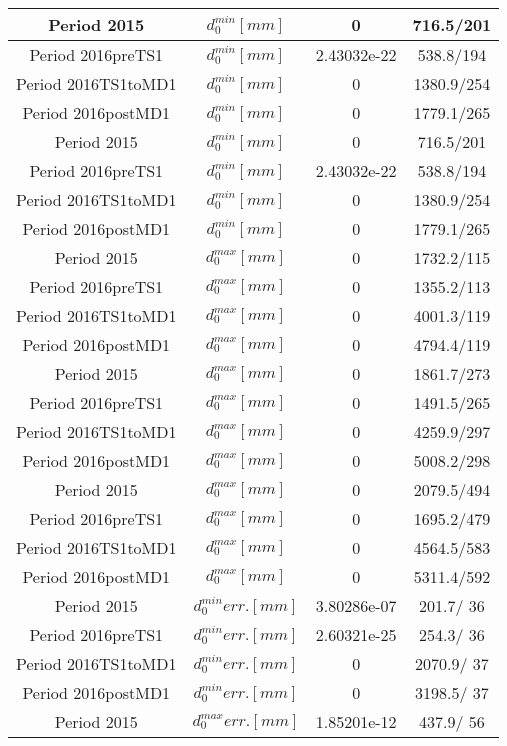 \documentclass{article}
\begin{document}
\begin{longtable}{c|c|c|c}
\hline
 Period 2015 & $d_{0}^{min} [mm]$ & 0 & 716.5/201\\
\hline
 Period 2016preTS1 & $d_{0}^{min} [mm]$ & 2.43032e-22 & 538.8/194\\
\hline
 Period 2016TS1toMD1 & $d_{0}^{min} [mm]$ & 0 & 1380.9/254\\
\hline
 Period 2016postMD1 & $d_{0}^{min} [mm]$ & 0 & 1779.1/265\\
\hline
 Period 2015 & $d_{0}^{min} [mm]$ & 0 & 716.5/201\\
\hline
 Period 2016preTS1 & $d_{0}^{min} [mm]$ & 2.43032e-22 & 538.8/194\\
\hline
 Period 2016TS1toMD1 & $d_{0}^{min} [mm]$ & 0 & 1380.9/254\\
\hline
 Period 2016postMD1 & $d_{0}^{min} [mm]$ & 0 & 1779.1/265\\
\hline
 Period 2015 & $d_{0}^{max} [mm]$ & 0 & 1732.2/115\\
\hline
 Period 2016preTS1 & $d_{0}^{max} [mm]$ & 0 & 1355.2/113\\
\hline
 Period 2016TS1toMD1 & $d_{0}^{max} [mm]$ & 0 & 4001.3/119\\
\hline
 Period 2016postMD1 & $d_{0}^{max} [mm]$ & 0 & 4794.4/119\\
\hline
 Period 2015 & $d_{0}^{max} [mm]$ & 0 & 1861.7/273\\
\hline
 Period 2016preTS1 & $d_{0}^{max} [mm]$ & 0 & 1491.5/265\\
\hline
 Period 2016TS1toMD1 & $d_{0}^{max} [mm]$ & 0 & 4259.9/297\\
\hline
 Period 2016postMD1 & $d_{0}^{max} [mm]$ & 0 & 5008.2/298\\
\hline
 Period 2015 & $d_{0}^{max} [mm]$ & 0 & 2079.5/494\\
\hline
 Period 2016preTS1 & $d_{0}^{max} [mm]$ & 0 & 1695.2/479\\
\hline
 Period 2016TS1toMD1 & $d_{0}^{max} [mm]$ & 0 & 4564.5/583\\
\hline
 Period 2016postMD1 & $d_{0}^{max} [mm]$ & 0 & 5311.4/592\\
\hline
 Period 2015 & $d_{0}^{min} err. [mm]$ & 3.80286e-07 & 201.7/ 36\\
\hline
 Period 2016preTS1 & $d_{0}^{min} err. [mm]$ & 2.60321e-25 & 254.3/ 36\\
\hline
 Period 2016TS1toMD1 & $d_{0}^{min} err. [mm]$ & 0 & 2070.9/ 37\\
\hline
 Period 2016postMD1 & $d_{0}^{min} err. [mm]$ & 0 & 3198.5/ 37\\
\hline
 Period 2015 & $d_{0}^{max} err. [mm]$ & 1.85201e-12 & 437.9/ 56\\

\end{longtable}
\end{document}
